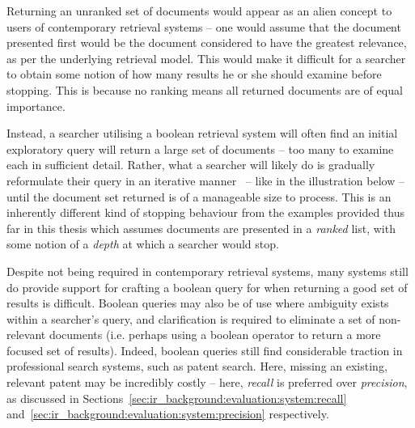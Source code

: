 Returning an unranked set of documents would appear as an alien concept to users of contemporary retrieval systems -- one would assume that the document presented first would be the document considered to have the greatest relevance, as per the underlying retrieval model. This would make it difficult for a searcher to obtain some notion of how many results he or she should examine before stopping. This is because no ranking means all returned documents are of equal importance.

Instead, a searcher utilising a boolean retrieval system will often find an initial exploratory query will return a large set of documents -- too many to examine each in sufficient detail. Rather, what a searcher will likely do is gradually reformulate their query in an iterative manner~\citep{koch2009iterative} -- like in the illustration below -- until the document set returned is of a manageable size to process. This is an inherently different kind of stopping behaviour from the examples provided thus far in this thesis which assumes documents are presented in a \emph{ranked} list, with some notion of a \emph{depth} at which a searcher would stop.

\begin{figure}[h]
    \centering
    \vspace{4mm}
    \label{fig:boolean_reduce}
    \vspace{-5mm}
\end{figure}

Despite not being required in contemporary retrieval systems, many systems still do provide support for crafting a boolean query for when returning a good set of results is difficult. Boolean queries may also be of use where ambiguity exists within a searcher's query, and clarification is required to eliminate a set of non-relevant documents (i.e. perhaps using a boolean operator to return a more focused set of results). Indeed, boolean queries still find considerable traction in professional search systems, such as patent search. Here, missing an existing, relevant patent may be incredibly costly -- here, \emph{recall} is preferred over \emph{precision}, as discussed in Sections~\ref{sec:ir_background:evaluation:system:recall} and~\ref{sec:ir_background:evaluation:system:precision} respectively.


